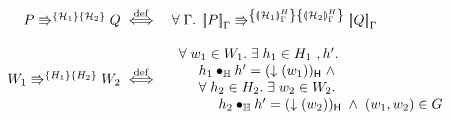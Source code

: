 %
%	
%	
\begin{definition}[Repartitioning]
%
\[
\begin{array}{r l}
	\repartitions{P}{Q}{\heapAss{1}}{\heapAss{2}} \iffdef 
	& \for{\lenv} \repartitions{\sem[\lenv]{P}}{\sem[\lenv]{Q}}{\semH[\lenv]{\heapAss{1}}}{\semH[\lenv]{\heapAss{2}}}\\\\
	
	\repartitions{W_1}{W_2}{H_{1}}{H_{2}} \iffdef &
	\begin{array}{l}
		\for{w_1 \in W_1} \exsts{h_1 \in H_1\ , h'}\\
		\hspace*{0.5cm} h_1 \composeH h' = \heapPart{(\collapseW{w_1})} \;\land\\
		\hspace*{0.5cm} \for{h_2 \in H_2} \exsts{w_2 \in W_2}\\
		\hspace*{1cm} h_2 \composeH h' = \heapPart{(\collapseW{w_2})} \;\land\; (w_1, w_2) \in \guarantee
	\end{array}
\end{array}
\]
%
\end{definition}
